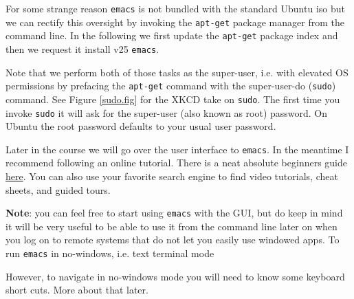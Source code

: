  
For some strange reason \texttt{emacs} is not bundled with the standard Ubuntu iso but we can rectify this oversight by invoking the \texttt{apt-get} package manager from the command line. In the following we first update the \texttt{apt-get} package index and then we request it install v25 \texttt{emacs}. 


Note that we perform both of those tasks as the super-user, i.e. with elevated OS permissions by prefacing the \texttt{apt-get} command with the super-user-do (\texttt{sudo}) command. See Figure \ref{sudo.fig} for the XKCD take on \texttt{sudo}. The first time you invoke \texttt{sudo} it will ask for the super-user (also known as root) password. On Ubuntu the root password defaults to your usual user password.


Later in the course we will go over the user interface to \texttt{emacs}. In the meantime I recommend following an online tutorial. There is a neat absolute beginners guide \href{http://www.jesshamrick.com/2012/09/10/absolute-beginners-guide-to-emacs/}{here}. You can also use your favorite search engine to find video tutorials, cheat sheets, and guided tours.

{\bf Note}: you can feel free to start using \texttt{emacs} with the GUI, but do keep in mind it will be very useful to be able to use it from the command line later on when you log on to remote systems that do not let you easily use windowed apps. To run \texttt{emacs} in no-windows, i.e. text terminal mode 


However, to navigate in no-windows mode you will need to know some keyboard short cuts. More about that later.

